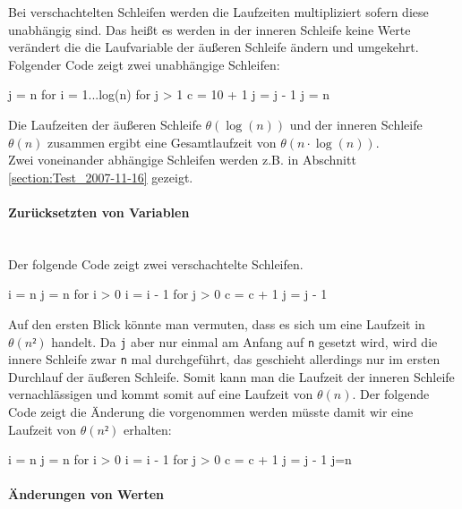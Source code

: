 \documentclass[a4paper, 12pt]{article}
\begin{document}
Bei verschachtelten Schleifen werden die Laufzeiten multipliziert sofern diese unabhängig sind. Das heißt es werden in der inneren Schleife keine Werte verändert die die Laufvariable der äußeren Schleife ändern und umgekehrt. Folgender Code zeigt zwei unabhängige Schleifen:

\begin{verbatimtab}
j = n
for i = 1...log(n) {
	for j > 1 {
		c = 10 + 1
		j = j - 1
	}
	j = n
}
\end{verbatimtab}

Die Laufzeiten der äußeren Schleife $θ\left(\log\left(n\right)\right)$ und der inneren Schleife $θ\left(n\right)$ zusammen ergibt eine Gesamtlaufzeit von $θ\left( n⋅\log\left(n\right) \right)$.\\

Zwei voneinander abhängige Schleifen werden z.B. in Abschnitt \ref{section:Test_2007-11-16} gezeigt.

\paragraph{Zurücksetzten von Variablen}~\\

Der folgende Code zeigt zwei verschachtelte Schleifen.

\begin{verbatimtab}
i = n
j = n
for i > 0 {
	i = i - 1
	for j > 0 {
		c = c + 1
		j = j - 1
	}
}
\end{verbatimtab}

Auf den ersten Blick könnte man vermuten, dass es sich um eine Laufzeit in $θ\left(n²\right)$ handelt. Da \texttt{j} aber nur einmal am Anfang auf \texttt{n} gesetzt wird, wird die innere Schleife zwar \texttt{n} mal durchgeführt, das geschieht allerdings nur im ersten Durchlauf der äußeren Schleife. Somit kann man die Laufzeit der inneren Schleife vernachlässigen und kommt somit auf eine Laufzeit von $θ\left(n\right)$. Der folgende Code zeigt die Änderung die vorgenommen werden müsste damit wir eine Laufzeit von $θ\left(n²\right)$ erhalten:

\begin{verbatimtab}
i = n
j = n
for i > 0 {
	i = i - 1
	for j > 0 {
		c = c + 1
		j = j - 1
	}
	j=n
}
\end{verbatimtab}

\paragraph{Änderungen von Werten}~\\
\end{document}
